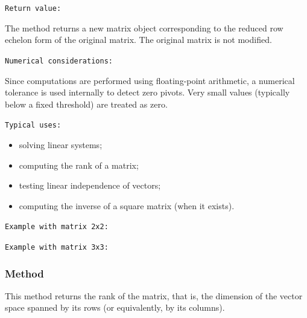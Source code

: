 \medskip
\texttt{Return value: }

The method returns a new matrix object corresponding to the reduced row echelon form of the original matrix.
The original matrix is not modified.

\medskip
\texttt{Numerical considerations: }

Since computations are performed using floating-point arithmetic, a numerical tolerance is used internally to detect zero pivots.
Very small values (typically below a fixed threshold) are treated as zero.

\medskip
\texttt{Typical uses: }

\begin{itemize}
\item solving linear systems;
\item computing the rank of a matrix;
\item testing linear independence of vectors;
\item computing the inverse of a square matrix (when it exists).
\end{itemize}

\texttt{Example with matrix 2x2: }

\begin{tkzexample}[latex=.5\textwidth]
\end{tkzexample}

\texttt{Example with matrix 3x3: }

\begin{tkzexample}[latex=.5\textwidth]
\end{tkzexample}




\subsubsection{Method }
\label{ssub:method_matrix_rank}

This method returns the rank of the matrix, that is, the dimension of the vector space spanned by its rows (or equivalently, by its columns).

